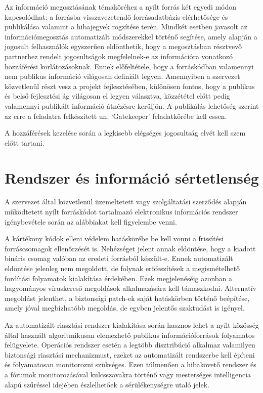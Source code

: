 \documentclass[12pt,magyar,a4paper,oneside]{scrreprt}
\begin{document}
Az információ megosztásának témaköréhez a nyílt forrás két egyedi módon
kapcsolódhat: a forrásba visszavezetendő forrásadatbázis elérhetősége és
publikálása valamint a hibajegyek rögzítése terén. Mindkét esetben
javasolt az információmegosztás automatizált módszerekkel történő
segítése, amely alapján a jogosult felhasználók egyszerűen eldönthetik,
hogy a megosztásban résztvevő partnerhez rendelt jogosultságok
megfelelnek-e az információra vonatkozó hozzáférési korlátozásoknak.
Ennek előfeltétele, hogy a forráskódban valamennyi nem publikus
információ világosan definiált legyen. Amennyiben a szervezet
közvetlenül részt vesz a projekt fejlesztésében, különösen fontos, hogy
a publikus és belső fejlesztési ág világosan el legyen választva,
közzététel előtt pedig valamennyi publikált információ átnézésre
kerüljön. A publikálás lehetőség szerint az erre a feladatra
felkészített un. `Gatekeeper' feladatkörébe kell essen.

A hozzáférések kezelése során a legkisebb elégséges jogosultság elvét
kell szem előtt tartani.

\hypertarget{rendszer-uxe9s-informuxe1ciuxf3-suxe9rtetlensuxe9g}{%
\section{Rendszer és információ
sértetlenség}\label{rendszer-uxe9s-informuxe1ciuxf3-suxe9rtetlensuxe9g}}

A szervezet által közvetlenül üzemeltetett vagy szolgáltatási szerződés
alapján működtetett nyílt forráskódot tartalmazó elektronikus
információs rendszer igénybevétele során az alábbiakat kell figyelembe
venni.

A kártékony kódok elleni védelem hatáskörébe be kell vonni a frissítési
forráscsomagok ellenőrzését is. Nehézséget jelent annak eldöntése, hogy
a kiadott bináris csomag valóban az eredeti forrásból készült-e. Ennek
automatizált eldöntése jelenleg nem megoldott, de folynak erőfeszítések
a megismételhető fordítási folyamatok kialakítása érdekében. Ezek
megjelenéséig azonban a hagyományos víruskereső megoldások alkalmazására
kell támaszkodni. Alternatív megoldást jelenthet, a biztonsági patch-ek
saját hatáskörben történő beépítése, amely jóval megbízhatóbb megoldás,
de egyben jelentős szaktudást is igényel.

Az automatizált riasztási rendszer kialakítása során hasznos lehet a
nyílt közösség által használt algoritmikusan elemezhető publikus
információforrások folyamatos felügyelete. Operációs rendszer esetén a
legtöbb disztribúció alkalmaz valamilyen biztonsági riasztási
mechanizmust, ezeket az automatizált rendszerbe kell építeni és
folyamatosan monitorozni szükséges. Ezen túlmenően a hibakövető rendszer
és a fórumok monitorozásával kulcsszavakra történő vagy mesterséges
intelligencia alapú szűréssel idejében észlelhetőek a sérülékenységre
utaló jelek.
\end{document}
